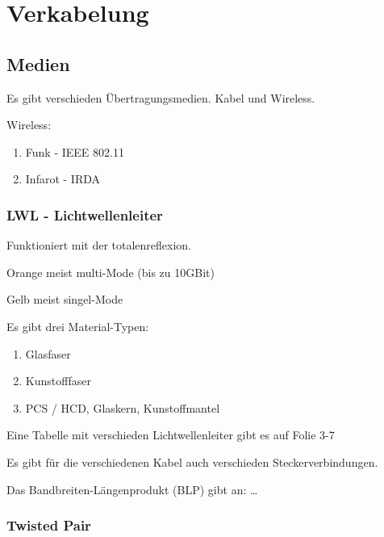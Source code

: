 \documentclass[a4paper]{article}
\title{\docTitle}
\author{Moritz}
\date{\today}
\begin{document}
\maketitle
\tableofcontents


\section{Verkabelung}

\subsection{Medien}

Es gibt verschieden Übertragungsmedien. Kabel und Wireless.

Wireless:

\begin{enumerate}
    \item Funk - IEEE 802.11
    \item Infarot - IRDA
\end{enumerate}

\subsubsection{LWL - Lichtwellenleiter}

Funktioniert mit der totalenreflexion.

Orange meist multi-Mode (bis zu 10GBit)

Gelb meist singel-Mode

Es gibt drei Material-Typen:

\begin{enumerate}
    \item Glasfaser
    \item Kunstofffaser
    \item PCS / HCD, Glaskern, Kunstoffmantel
\end{enumerate}

Eine Tabelle mit verschieden Lichtwellenleiter gibt es auf Folie 3-7

Es gibt für die verschiedenen Kabel auch verschieden Steckerverbindungen.

Das Bandbreiten-Längenprodukt (BLP) gibt an: \dots %

\subsubsection{Twisted Pair}
\end{document}
